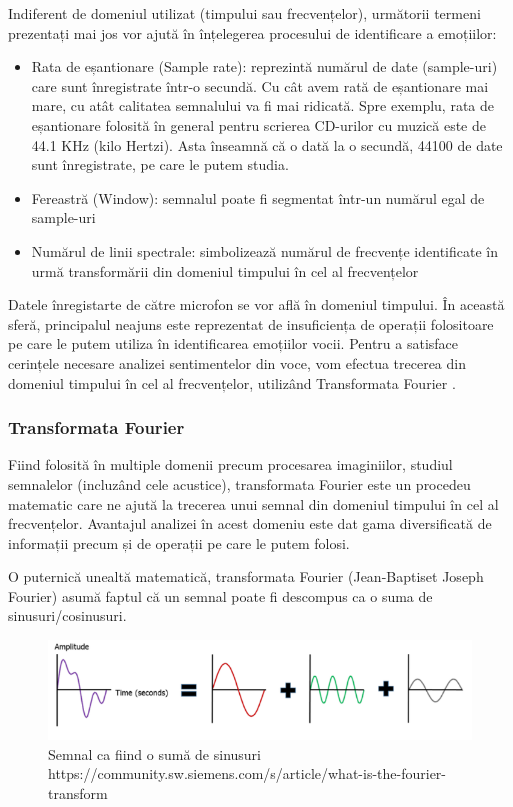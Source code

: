\documentclass[a4paper, 12pt]{report}
\begin{document}
	Indiferent de domeniul utilizat (timpului sau frecvențelor), următorii termeni prezentați mai jos vor ajută în înțelegerea procesului de identificare a emoțiilor:
	
  	\begin{itemize} 
  		\item Rata de eșantionare (Sample rate): reprezintă numărul de date (sample-uri) care sunt înregistrate într-o secundă. Cu cât avem rată de eșantionare mai mare, cu atât calitatea semnalului va fi mai ridicată. Spre exemplu, rata de eșantionare folosită în general pentru scrierea CD-urilor cu muzică este de 44.1 KHz (kilo Hertzi). Asta înseamnă că o dată la o secundă, 44100 de date sunt înregistrate, pe care le putem studia. 
  		\item Fereastră (Window): semnalul poate fi segmentat într-un numărul egal de sample-uri 
  		\item Numărul de linii spectrale: simbolizează numărul de frecvențe identificate în urmă transformării din domeniul timpului în cel al frecvențelor 
  	\end{itemize} 
 	 Datele înregistarte de către microfon se vor află în domeniul timpului. În această sferă, principalul neajuns este reprezentat de insuficiența de operații folositoare pe care le putem utiliza în identificarea emoțiilor vocii. Pentru a satisface cerințele necesare analizei sentimentelor din voce, vom efectua trecerea din domeniul timpului în cel al frecvențelor, utilizând Transformata Fourier \cite{ft}. 
  
 	 \clearpage 
  	\subsubsection{Transformata Fourier} 
  	Fiind folosită în multiple domenii precum procesarea imaginiilor, studiul semnalelor (incluzând cele acustice), transformata Fourier este un procedeu matematic care ne ajută la trecerea unui semnal din domeniul timpului în cel al frecvențelor. Avantajul analizei în acest domeniu este dat gama diversificată de informații precum și de operații pe care le putem folosi. 
  	
  	O puternică unealtă matematică, transformata Fourier (Jean-Baptiset Joseph Fourier) asumă faptul că un semnal poate fi descompus ca o suma de sinusuri/cosinusuri.
	
	\begin{figure}[h]
		\begin{center}
			\includegraphics[width=\linewidth]{images/signals.png}
		\end{center}
		\caption{Semnal ca fiind o sumă de sinusuri\newline
			\hspace{\linewidth}https://community.sw.siemens.com/s/article/what-is-the-fourier-transform}
		\label{fig:singal_to_sinuses}
	\end{figure}
\end{document}
